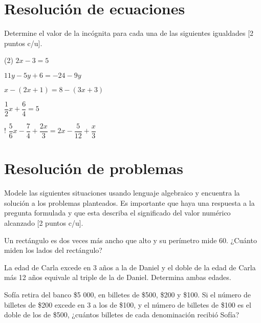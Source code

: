 \documentclass[sin curso]{plantilla-evaluacion-v1}
\begin{document}
\section{Resolución de ecuaciones}
Determine el valor de la incógnita para cada una de las siguientes igualdades [2 puntos c/u].

\begin{preguntas}(2)
  \pregunta $2x-3=5$
  \begin{malla}[height=3cm]
  \end{malla}
  \pregunta $11y - 5y + 6 = -24 -9y$
  \begin{malla}[height=3cm]
  \end{malla}
  \pregunta $x-(2x+1)=8-(3x+3)$
  \begin{malla}[height=5cm]
  \end{malla}
  \pregunta $\dfrac{1}{2}x+\dfrac{6}{4}=5$
  \begin{malla}[height=5cm]
  \end{malla}
  \pregunta! $\dfrac{5}{6}x-\dfrac{7}{4}+\dfrac{2x}{3}=2x -\dfrac{5}{12}+\dfrac{x}{3}$
  \begin{malla}[height=6cm]
  \end{malla}
\end{preguntas}

\section{Resolución de problemas}
Modele las siguientes situaciones usando lenguaje algebraico y encuentra la solución a los
problemas planteados. Es importante que haya una respuesta a la pregunta formulada y 
que esta describa el significado del valor numérico alcanzado [2 puntos c/u].

\begin{preguntas}
  \pregunta Un rectángulo es dos veces más ancho que alto y su perímetro mide 60. 
  ¿Cuánto miden los lados del rectángulo? 
  \begin{malla}[height=3.5cm]
  \end{malla}
  \begin{respuesta}[height=1.5cm]
  \end{respuesta}

  \pregunta La edad de Carla excede en 3 años a la de Daniel y el doble de la edad de Carla 
  más 12 años equivale al triple de la de Daniel. Determina ambas edades.
  \begin{malla}[height=7cm]
  \end{malla}
  \begin{respuesta}[height=2.5cm]
  \end{respuesta}

  \pregunta Sofía retira del banco \$5 000, en billetes de \$500, \$200 y \$100. Si el 
  número de billetes de \$200 excede en 3 a los de \$100, y el número de billetes de \$100 
  es el doble de los de \$500, ¿cuántos billetes de cada denominación recibió Sofía?
  \begin{malla}[height=7cm]
  \end{malla}
  \begin{respuesta}[height=2.5cm]
  \end{respuesta}

\end{preguntas}
\end{document}
